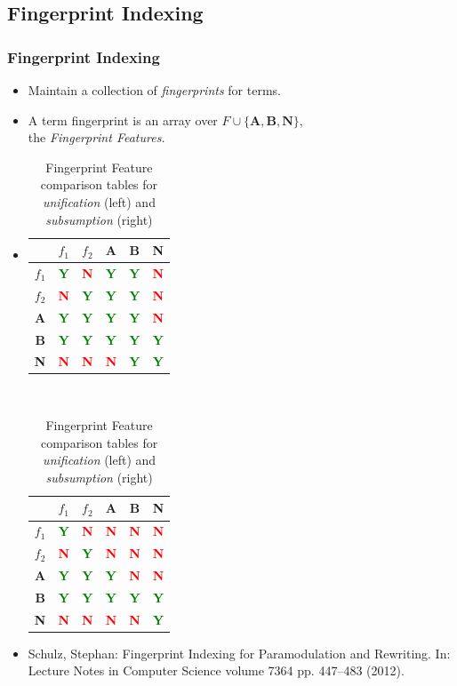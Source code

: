 \documentclass[10pt,xcolor={dvipsnames}]{beamer}
\newcommand{\compY}{\textcolor{Green}{\textbf{Y}}}
\newcommand{\compN}{\textcolor{Red}{\textbf{N}}}
\begin{document}
\begin{NoHyper}
\subsection{Fingerprint Indexing} 
\begin{frame}
  \frametitle{Fingerprint Indexing}
  \begin{itemize}
  \item<1-> Maintain a collection of \emph{fingerprints} for terms.
  \item<2-> A term fingerprint is an array over $F \cup \{\mathbf{A, B, N}\}$,\\ the \emph{Fingerprint Features.}
  \item<3->[] 
  {\small \begin{table}\caption{Fingerprint Feature comparison tables for \emph{unification}
  (left) and \emph{subsumption} (right)}\begin{tabular}{| c || c | c | c | c | c |}
  \hline
           &  $f_1$      &  $f_2$      &  \textbf{A} &  \textbf{B} &  \textbf{N} \\ \hline \hline
  $f_1$    &  \compY &  \compN &  \compY &  \compY &  \compN \\ 
  $f_2$    &  \compN &  \compY &  \compY &  \compY &  \compN \\ 
\textbf{A} &  \compY &  \compY &  \compY &  \compY &  \compN \\
\textbf{B} &  \compY &  \compY &  \compY &  \compY &  \compY \\ 
\textbf{N} &  \compN &  \compN &  \compN &  \compY &  \compY \\ \hline
  \end{tabular}\ \ \ \ \ \ \begin{tabular}{| c || c | c | c | c | c |}
  \hline
           &  $f_1$      &  $f_2$      &  \textbf{A} &  \textbf{B} &  \textbf{N} \\ \hline \hline
  $f_1$    &  \compY &  \compN &  \compN &  \compN &  \compN \\ 
  $f_2$    &  \compN &  \compY &  \compN &  \compN &  \compN \\ 
\textbf{A} &  \compY &  \compY &  \compY &  \compN &  \compN \\
\textbf{B} &  \compY &  \compY &  \compY &  \compY &  \compY \\ 
\textbf{N} &  \compN &  \compN &  \compN &  \compN &  \compY \\ \hline
  \end{tabular}\end{table}}\vspace{0.5cm}
  \item<4-> {\footnotesize Schulz, Stephan: Fingerprint Indexing for Paramodulation and Rewriting. In:
  Lecture Notes in Computer Science volume 7364 pp. 447--483 (2012).}


\end{itemize}
\end{frame}
\end{NoHyper}
\end{document}

